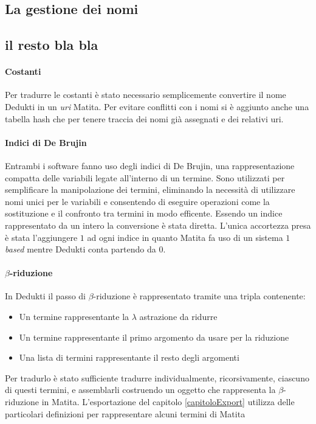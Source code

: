 \documentclass[12pt,a4paper]{report}
\begin{document}
\subsection{La gestione dei nomi}

\subsection{il resto bla bla}

\paragraph{Costanti}
Per tradurre le costanti è stato necessario semplicemente convertire il nome
Dedukti in un \textit{uri} Matita. Per evitare conflitti con i nomi si è aggiunto
anche una tabella hash che per tenere traccia dei nomi già assegnati e dei 
relativi uri.

\paragraph{Indici di De Brujin}
Entrambi i software fanno uso degli indici di De Brujin, una rappresentazione
compatta delle variabili legate all'interno di un termine. Sono utilizzati per
semplificare la manipolazione dei termini, eliminando la necessità di utilizzare
nomi unici per le variabili e consentendo di eseguire operazioni come la 
sostituzione e il confronto tra termini in modo efficente. 
Essendo un indice rappresentato da un intero la conversione è stata diretta.
L'unica accortezza presa è stata l'aggiungere $1$ ad ogni indice in quanto
Matita fa uso di un sistema \textit{$1$ based} mentre Dedukti conta partendo
da $0$.

\paragraph{$\beta$-riduzione}
In Dedukti il passo di $\beta$-riduzione è rappresentato tramite una tripla
contenente: 
\begin{itemize}
  \item Un termine rappresentante la $\lambda$ astrazione da ridurre
  \item Un termine rappresentante il primo argomento da usare per la riduzione
  \item Una lista di termini rappresentante il resto degli argomenti
\end{itemize}
Per tradurlo è stato sufficiente tradurre individualmente, ricorsivamente, ciascuno
di questi termini, e assemblarli costruendo un oggetto che rappresenta la 
$\beta$-riduzione in Matita. 
L'esportazione del capitolo \ref{capitoloExport} utilizza delle particolari
definizioni per rappresentare alcuni termini di Matita %
\end{document}
